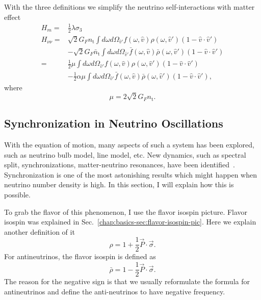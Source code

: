 With the three definitions we simplify the neutrino self-interactions with matter effect
\begin{align*}
   H_m =& \frac{1}{2} \lambda \sigma_3 \\
   H_{\nu\nu} =& \sqrt{2}G_F n_{\mathrm{t}} \int d\omega d\Omega_{\hat v'} f(\omega,\hat v)\rho(\omega,\hat v') (1-\hat v \cdot \hat v') \\
   & - \sqrt{2}G_F \bar n_{\mathrm{t}} \int d\omega d\Omega_{\hat v'} \bar f(\omega,\hat v)\bar\rho(\omega,\hat v') (1-\hat v \cdot \hat v') \\
   =& \frac{1}{2}\mu \int d\omega d\Omega_{\hat v'} f(\omega, \hat v)\rho(\omega,\hat v') (1-\hat v \cdot \hat v') \\
   & - \frac{1}{2}\alpha \mu \int d\omega d\Omega_{\hat v'} \bar f(\omega, \hat v)\bar\rho(\omega,\hat v') (1-\hat v \cdot \hat v') ,
\end{align*}
where
\begin{equation}
   \mu = 2\sqrt{2} G_F n_{\mathrm{t}}. 
\end{equation}
   



\subsection{Synchronization in Neutrino Oscillations}


With the equation of motion, many aspects of such a system has been explored, such as neutrino bulb model, line model, etc. New dynamics, such as spectral split, synchronizations, matter-neutrino resonances, have been identified~\cite{Duan2006,Malkus2014,Vaananen2015}. Synchronization is one of the most astonishing results which might happen when neutrino number density is high. In this section, I will explain how this is possible.

To grab the flavor of this phenomenon, I use the flavor isospin picture. Flavor isospin was explained in Sec.~\ref{chap:basics-sec:flavor-isospin-pic}. Here we explain another definition of it
\begin{equation}
   \rho = 1 + \frac{1}{2}\vec P \cdot \vec \sigma. 
\end{equation}
For antineutrinos, the flavor isospin is defined as
\begin{equation}
    \bar\rho = 1 - \frac{1}{2} \vec P \cdot \vec \sigma.
\end{equation}
The reason for the negative sign is that we usually reformulate the formula for antineutrinos and define the anti-neutrinos to have negative frequency.

